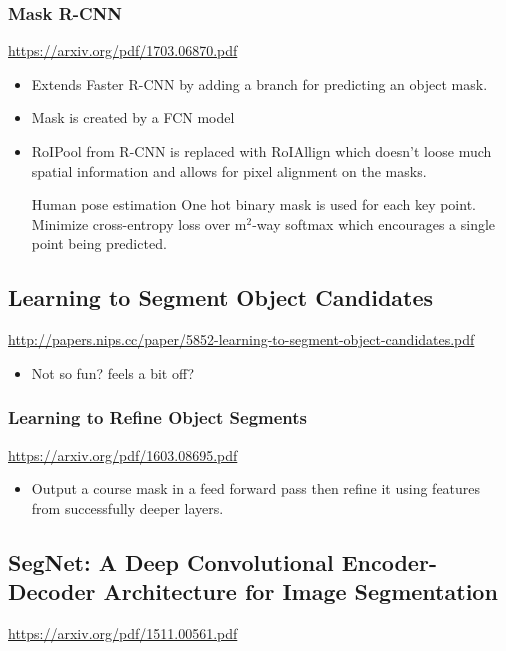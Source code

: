 \documentclass[11pt]{article}
\begin{document}
\subsubsection{Mask R-CNN}
\label{sec:orgb42fcd8}
\url{https://arxiv.org/pdf/1703.06870.pdf}

\begin{itemize}
\item Extends Faster R-CNN by adding a branch for predicting an object mask.
\item Mask is created by a FCN model
\item RoIPool from R-CNN is replaced with RoIAllign which doesn't loose much spatial information and allows for pixel alignment on the masks.
\item[{Human pose estimation}] One hot binary mask is used for each key point. Minimize cross-entropy loss over m\(^{\text{2}}\)-way softmax which encourages a single point being predicted.
\end{itemize}

\subsection{Learning to Segment Object Candidates}
\label{sec:orga8c1807}
\url{http://papers.nips.cc/paper/5852-learning-to-segment-object-candidates.pdf}
\begin{itemize}
\item Not so fun? feels a bit off?
\end{itemize}

\subsubsection{Learning to Refine Object Segments}
\label{sec:orgaf3ebc9}
\url{https://arxiv.org/pdf/1603.08695.pdf}
\begin{itemize}
\item Output a course mask in a feed forward pass then refine it using features from successfully deeper layers.
\end{itemize}

\subsection{SegNet: A Deep Convolutional Encoder-Decoder Architecture for Image Segmentation}
\label{sec:org16d36bf}
\url{https://arxiv.org/pdf/1511.00561.pdf}
\end{document}
